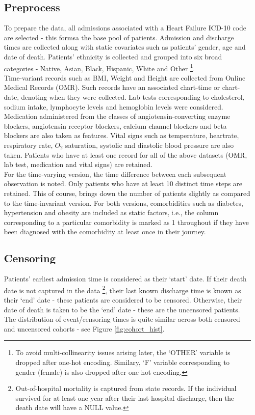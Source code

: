 \documentclass[%
 twocolumn,
 reprint,
 amsmath,amssymb,
 aps,nofootinbib
]{revtex4-2}
\begin{document}
\subsection{\label{preprocess}Preprocess}
To prepare the data, all admissions associated with a Heart Failure ICD-10 code \cite{ICDs} are selected - this formsa the base pool of patients. Admission and discharge times are collected along with static covariates such as patients' gender, age and date of death. Patients' ethnicity is collected and grouped into six broad categories - Native, Asian, Black, Hispanic, White and Other \footnote{To avoid multi-collinearity issues arising later, the `OTHER' variable is dropped after one-hot encoding. Similary, `F' variable corresponding to gender (female) is also dropped after one-hot encoding.}.\\

Time-variant records such as BMI, Weight and Height are collected from Online Medical Records (OMR). Such records have an associated chart-time or chart-date, denoting when they were collected. Lab tests corresponding to cholesterol, sodium intake, lymphocyte levels \cite{lymph_count} and hemoglobin levels \cite{hemo} were considered. Medication administered from the classes of angiotensin-converting enzyme blockers, angiotensin receptor blockers, calcium channel blockers and beta blockers are also taken as features. Vital signs such as temperature, heartrate, respiratory rate, $O_2$ saturation, systolic and diastolic blood pressure are also taken. Patients who have at least one record for all of the above datasets (OMR, lab test, medication and vital signs) are retained. \\

For the time-varying version, the time difference between each subsequent observation is noted. Only patients who have at least 10 distinct time steps are retained. This of course, brings down the number of patients slightly as compared to the time-invariant version. For both versions, comorbidities such as diabetes, hypertension and obesity are included as static factors, i.e., the column corresponding to a particular comorbidity is marked as 1 throughout if they have been diagnosed with the comorbidity at least once in their journey.


\subsection{\label{censoring}Censoring}
Patients' earliest admission time is considered as their `start' date. If their death date is not captured in the data \footnote{Out-of-hospital mortality is captured from state records. If the individual survived for at least one year after their last hospital discharge, then the death date will have a NULL value.}, their last known discharge time is known as their `end' date - these patients are considered to be censored. Otherwise, their date of death is taken to be the `end' date - these are the uncensored patients. The distribution of event/censoring times is quite similar across both censored and uncensored cohorts - see Figure \ref{fig:cohort_hist}.
\end{document}
